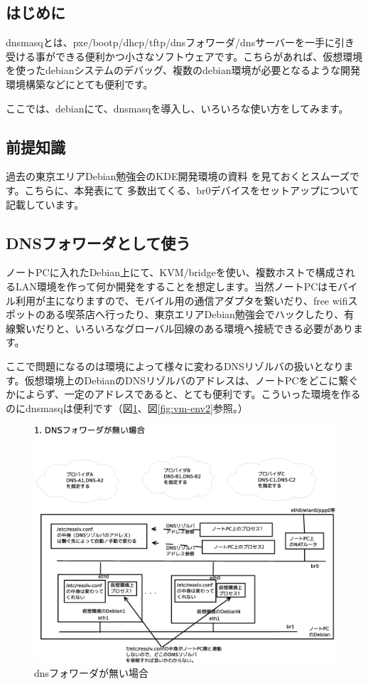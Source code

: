 \documentclass[mingoth,a4paper]{jsarticle}
\begin{document}

\subsection{はじめに}

 dnsmasqとは、pxe/bootp/dhcp/tftp/dnsフォワーダ/dnsサーバーを一手に引き受ける事ができる便利かつ小さなソフトウェアです。こちらがあれば、仮想環境を使ったdebianシステムのデバッグ、複数のdebian環境が必要となるような開発環境構築などにとても便利です。

 ここでは、debianにて、dnsmasqを導入し、いろいろな使い方をしてみます。

\subsection{前提知識}

 過去の東京エリアDebian勉強会のKDE開発環境の資料
\cite{kde-devel-debian}を見ておくとスムーズです。こちらに、本発表にて
多数出てくる、br0デバイスをセットアップについて記載しています。

\subsection{DNSフォワーダとして使う}

 ノートPCに入れたDebian上にて、KVM/bridgeを使い、複数ホストで構成されるLAN環境を作って何か開発をすることを想定します。当然ノートPCはモバイル利用が主になりますので、モバイル用の通信アダプタを繋いだり、free wifiスポットのある喫茶店へ行ったり、東京エリアDebian勉強会でハックしたり、有線繋いだりと、いろいろなグローバル回線のある環境へ接続できる必要があります。

 ここで問題になるのは環境によって様々に変わるDNSリゾルバの扱いとなります。仮想環境上のDebianのDNSリゾルバのアドレスは、ノートPCをどこに繋ぐかによらず、一定のアドレスであると、とても便利です。こういった環境を作るのにdnsmasqは便利です（図\ref{fig:vm-env1}、図\ref{fig:vm-env2}参照。）

\begin{figure}[H]
\begin{center}
 \includegraphics[width=0.5\hsize]{image201402/vm-dns-env.eps}
 \caption{dnsフォワーダが無い場合}\label{fig:vm-env1}
\end{center}
\end{figure}
\end{document}
